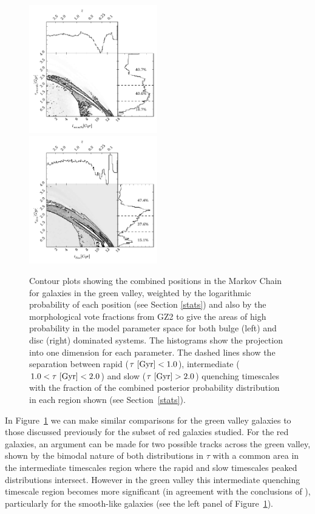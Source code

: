 \begin{figure}
\includegraphics[width=0.4975\textwidth]{morphology/green_smooth.pdf}
\includegraphics[width=0.4975\textwidth]{morphology/green_disc.pdf}
\caption[Population densities of green smooth and disc galaxies]{Contour plots showing the combined positions in the Markov Chain for galaxies in the green valley, weighted by the logarithmic probability of each position (see Section \ref{stats}) and also by the morphological vote fractions from GZ2 to give the areas of high probability in the model parameter space for both bulge (left) and disc (right) dominated systems. The histograms show the projection into one dimension for each parameter. The dashed lines show the separation between rapid ($\tau ~\rm{[Gyr]} < 1.0$), intermediate ($1.0 < \tau ~\rm{[Gyr]} < 2.0$) and slow ($\tau ~\rm{[Gyr]} > 2.0$) quenching timescales with the fraction of the combined posterior probability distribution in each region shown (see Section~\ref{stats}).}
\label{green_v}
\end{figure}

In Figure~\ref{green_v} we can make similar comparisons for the green valley galaxies to those discussed previously for the subset of red galaxies studied. For the red galaxies, an argument can be made for two possible tracks across the green valley, shown by the bimodal nature of both distributions in $\tau$ with a common area in the intermediate timescales region where the rapid and slow timescales peaked distributions intersect. However in the green valley this intermediate quenching timescale region becomes more significant  (in agreement with the conclusions of \citealt{Gonc12}), particularly for the smooth-like galaxies (see the left panel of Figure~\ref{green_v}).

